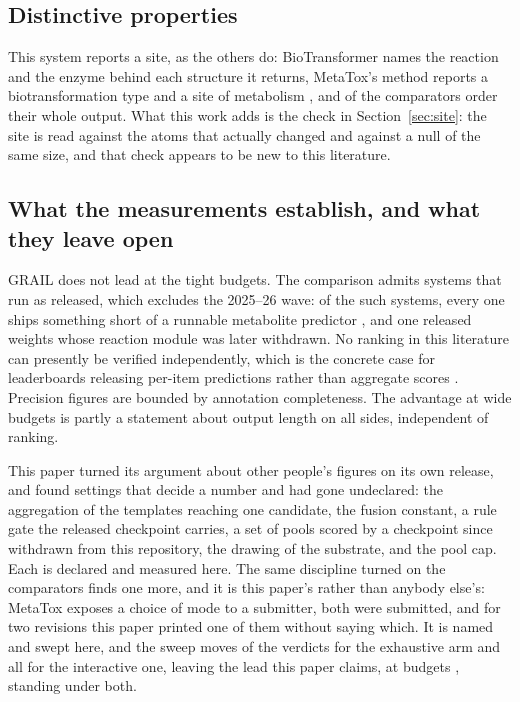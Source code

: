 \subsection{Distinctive properties}

This system reports a site, as the others do: BioTransformer names the reaction and the enzyme
behind each structure it returns, MetaTox's method reports a biotransformation type and a site of
metabolism \citep{Rudik_2017}, and \numArmreturnOrderingWord{} of the \numComparatorsNWord{}
comparators order their whole output. What this work adds is the check in Section~\ref{sec:site}:
the site is read against the atoms that actually changed and against a null of the same size, and
that check appears to be new to this literature.

\subsection{What the measurements establish, and what they leave open}

GRAIL does not lead at the tight budgets. The comparison admits systems that run as released, which
excludes the 2025--26 wave: of the \numComparatorsUnavailableWord{} such systems, every one ships
something short of a runnable metabolite predictor \citep{Larsson_2025, Zhou_2025, Zhou_2026,
Chavan_2026}, and one released weights whose reaction module was later withdrawn. No ranking in this literature can presently be verified
independently, which is the concrete case for leaderboards releasing per-item predictions rather
than aggregate scores \citep{Rodriguez_2021, Mishra_2021}. Precision figures are bounded by
annotation completeness. The advantage at wide budgets is partly a statement about output
length on all sides, independent of ranking.

This paper turned its argument about other people's figures on its own release, and found settings
that decide a number and had gone undeclared: the aggregation of the templates reaching one
candidate, the fusion constant, a rule gate the released checkpoint carries, a set of pools scored
by a checkpoint since withdrawn from this repository, the drawing of the substrate, and the pool
cap.
Each is declared and measured here. The same discipline turned on the comparators finds one more,
and it is this paper's rather than anybody else's: MetaTox exposes a choice of mode to a submitter,
both were submitted, and for two revisions this paper printed one of them without saying which. It
is named and swept here, and the sweep moves \numMtmodeShiftsbankWord{} of the
\numMtmodeBudgetsWord{} verdicts for the exhaustive arm and all \numMtmodeShiftstrainedWord{} for
the interactive one, leaving the lead this paper claims, at budgets \numMtmodeWidebudgets{},
standing under both.

